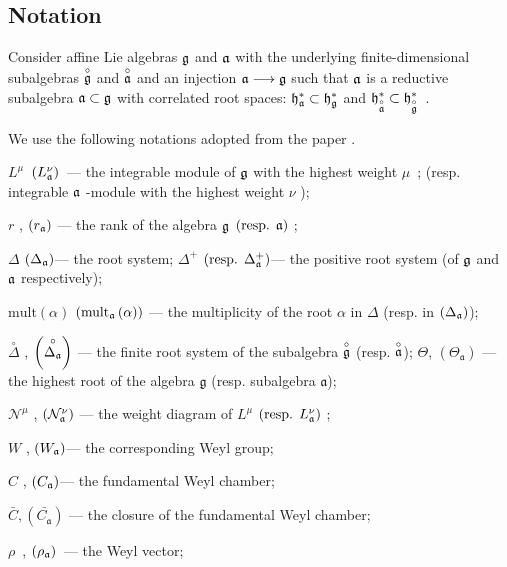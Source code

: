 \documentclass[a4paper,12pt]{article}
\theoremstyle{definition} \newtheorem{Def}{Definition}
\newcommand{\go}{\overset{\circ }{\frak{g}}}
\newcommand{\ao}{\overset{\circ }{\frak{a}}}
\newcommand{\co}[1]{\overset{\circ }{#1}}
\begin{document}
\subsection{Notation}
\label{sec:notation}

Consider affine Lie algebras $\frak{g}$ and $\frak{a}$ with the
underlying finite-dimensional subalgebras $\go$ and $%
\ao$ and an injection $\frak{a}\longrightarrow \frak{g%
}$ such that $\frak{a}$ is a reductive subalgebra $\frak{a\subset g}$ with
correlated root spaces: $\frak{h}_{\frak{a}}^{\ast }\subset \frak{h}_{\frak{g%
}}^{\ast }$ and $\frak{h}_{\ao}^{\ast }\subset \frak{h%
}_{\go}^{\ast }$\ .

We use the following notations adopted from the paper \cite{ilyin812pbc}.

$L^{\mu }$\ $\left( L_{\frak{a}}^{\nu }\right) $\ --- the integrable module
of $\frak{g}$ with the highest weight $\mu $\ ; (resp. integrable $\frak{a}$
-module with the highest weight $\nu $ );

$r$ , $\left( r_{\frak{a}}\right) $ --- the rank of the algebra $\frak{g}$ $%
\left( \text{resp. }\frak{a}\right) $ ;

$\Delta $ $\left( \Delta _{\frak{a}}\right) $--- the root system; $\Delta
^{+} $ $\left( \text{resp. }\Delta _{\frak{a}}^{+}\right) $--- the positive
root system (of $\frak{g}$ and $\frak{a}$ respectively);

$\mathrm{mult}\left( \alpha \right) $ $\left( \mathrm{mult}_{\frak{a}}\left(
\alpha \right) \right) $ --- the multiplicity of the root $\alpha$ in $\Delta
$ (resp. in $\left( \Delta _{\frak{a}}\right) $);

$\co{\Delta}$ , $\left( \co{\Delta _{\frak{a}}}%
\right)$ --- the finite root system of the subalgebra $\co{%
\frak{g}}$ (resp. $\co{\frak{a}}$);
$\Theta$, $(\Theta_{\mathfrak{a}})$ --- the highest root of the algebra $\mathfrak{g}$ (resp. subalgebra $\mathfrak{a}$);

$\mathcal{N}^{\mu }$ , $\left( \mathcal{N}_{\frak{a}}^{\nu }\right) $ --- the
weight diagram of $L^{\mu }$ $\left( \text{resp. }L_{\frak{a}}^{\nu }\right)
$ ;

$W$ , $\left( W_{\frak{a}}\right) $--- the corresponding Weyl group;

$C$ , $\left( C_{\frak{a}}\right) $--- the fundamental Weyl chamber;

$\bar{C}, \left(\bar{C_{\mathfrak{a}}}\right)$ --- the closure of the fundamental Weyl chamber;

$\rho $\ , $\left( \rho _{\frak{a}}\right) $\ --- the Weyl vector;
\end{document}
